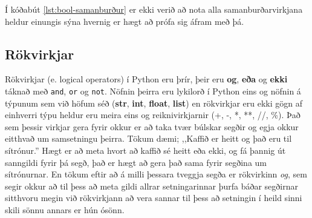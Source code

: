 Í kóðabút \ref{lst:bool-samanburður} er ekki verið að nota alla samanburðarvirkjana heldur einungis sýna hvernig er hægt að prófa sig áfram með þá.

\subsection{Rökvirkjar}
Rökvirkjar (e. logical operators) í Python eru þrír, þeir eru \textbf{og}, \textbf{eða}  og \textbf{ekki} táknað með \texttt{and}, \texttt{or} og \texttt{not}.
Nöfnin þeirra eru lykilorð í Python eins og nöfnin á týpunum sem við höfum séð (\textbf{str}, \textbf{int}, \textbf{float}, \textbf{list}) en rökvirkjar eru ekki gögn af einhverri týpu heldur eru meira eins og reiknivirkjarnir (+, -, *, **, //, \%).
Það sem þessir virkjar gera fyrir okkur er að taka tvær búlskar segðir og egja okkur eitthvað um samsetningu þeirra.
Tökum dæmi; ,,Kaffið er heitt og það eru til sítrónur.'' 
Hægt er að meta hvort að kaffið sé heitt eða ekki, og fá þannig út sanngildi fyrir þá segð, það er hægt að gera það sama fyrir segðina um sítrónurnar.
En tökum eftir að á milli þessara tveggja segða er rökvirkinn \textit{og}, sem segir okkur að til þess að meta gildi allrar setningarinnar þurfa báðar segðirnar sitthvoru megin við rökvirkjann að vera sannar til þess að setningin í heild sinni skili sönnu annars er hún ósönn.
\vspace{10pt}
